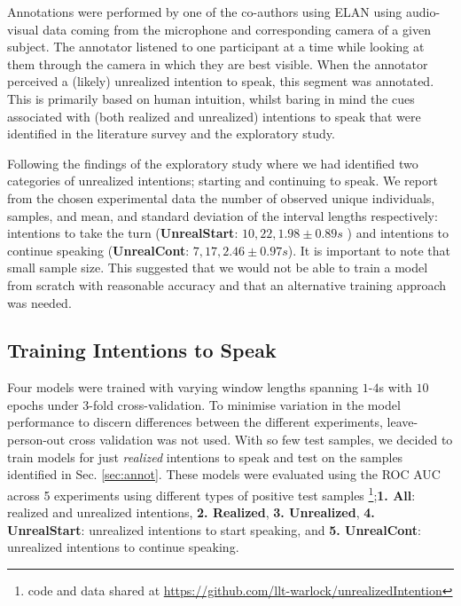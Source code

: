 \documentclass[sigconf]{acmart}
\begin{document}
Annotations were performed by one of the co-authors
using ELAN \cite{elan} using audio-visual data coming from the microphone and corresponding camera of a given subject. 
The annotator listened to one participant at a time while looking at them through the camera in which they are best visible. 
When the annotator perceived a (likely) unrealized intention to speak, this segment was annotated. This is primarily based on human intuition, whilst baring in mind the cues associated with (both realized and unrealized) intentions to speak that were identified in the literature survey and the exploratory study.

Following the findings of the exploratory study where we had identified two categories of unrealized intentions; starting and continuing to speak. We report from the chosen experimental data the number of observed unique individuals, samples, and mean, and standard deviation of the interval lengths respectively: intentions to take the turn (\textbf{UnrealStart}: $10,22,1.98\pm0.89s$ ) and intentions to continue speaking (\textbf{UnrealCont}: $7,17,2.46\pm0.97s$). 
It is important to note that small sample size. This suggested that we would not be able to train a model from scratch with reasonable accuracy and that an alternative training approach was needed.


\subsection{Training Intentions to Speak}
\label{sec:training}
Four models were trained with varying window lengths spanning $1$-$4$s with $10$ epochs under $3$-fold cross-validation. To minimise variation in the model performance to discern differences between the different experiments, leave-person-out cross validation was not used. With so few test samples, we decided to train models for just \emph{realized} intentions to speak and test on the samples identified in Sec. \ref{sec:annot}. These models were evaluated using the ROC AUC across 5 experiments using different types of positive test samples \footnote{code and data shared at \url{https://github.com/llt-warlock/unrealizedIntention}};\textbf{1. All}: realized and unrealized intentions, 
\textbf{2. Realized}, 
\textbf{3. Unrealized}, 
 \textbf{4. UnrealStart}: unrealized intentions to start speaking, and \textbf{5. UnrealCont}: unrealized intentions to continue speaking.
\end{document}
